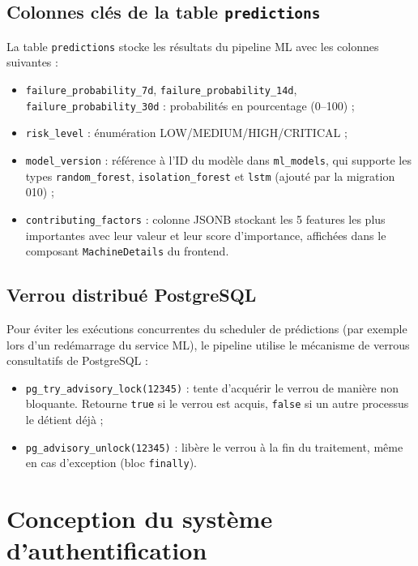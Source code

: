 \subsection{Colonnes clés de la table \texttt{predictions}}

La table \texttt{predictions} stocke les résultats du pipeline ML avec les colonnes
suivantes :
\begin{itemize}
  \item \texttt{failure\_probability\_7d}, \texttt{failure\_probability\_14d},
        \texttt{failure\_probability\_30d} : probabilités en pourcentage (0--100) ;
  \item \texttt{risk\_level} : énumération LOW/MEDIUM/HIGH/CRITICAL ;
  \item \texttt{model\_version} : référence à l'ID du modèle dans \texttt{ml\_models},
        qui supporte les types \texttt{random\_forest}, \texttt{isolation\_forest} et
        \texttt{lstm} (ajouté par la migration 010) ;
  \item \texttt{contributing\_factors} : colonne JSONB stockant les 5 features les plus
        importantes avec leur valeur et leur score d'importance, affichées dans le
        composant \texttt{MachineDetails} du frontend.
\end{itemize}

\subsection{Verrou distribué PostgreSQL}

Pour éviter les exécutions concurrentes du scheduler de prédictions (par exemple lors
d'un redémarrage du service ML), le pipeline utilise le mécanisme de verrous consultatifs
de PostgreSQL :

\begin{itemize}
  \item \texttt{pg\_try\_advisory\_lock(12345)} : tente d'acquérir le verrou de manière
        non bloquante. Retourne \texttt{true} si le verrou est acquis, \texttt{false}
        si un autre processus le détient déjà ;
  \item \texttt{pg\_advisory\_unlock(12345)} : libère le verrou à la fin du traitement,
        même en cas d'exception (bloc \texttt{finally}).
\end{itemize}

\section{Conception du système d'authentification}


